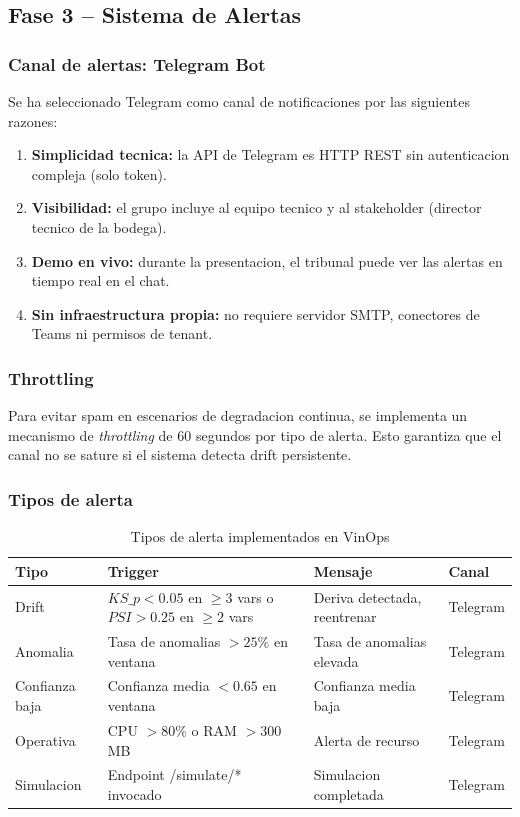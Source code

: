 \subsection{Fase 3 -- Sistema de Alertas}

\subsubsection{Canal de alertas: Telegram Bot}

Se ha seleccionado Telegram como canal de notificaciones por las siguientes razones:

\begin{enumerate}
    \item \textbf{Simplicidad tecnica:} la API de Telegram es HTTP REST sin autenticacion compleja (solo token).
    \item \textbf{Visibilidad:} el grupo incluye al equipo tecnico y al stakeholder (director tecnico de la bodega).
    \item \textbf{Demo en vivo:} durante la presentacion, el tribunal puede ver las alertas en tiempo real en el chat.
    \item \textbf{Sin infraestructura propia:} no requiere servidor SMTP, conectores de Teams ni permisos de tenant.
\end{enumerate}

\subsubsection{Throttling}

Para evitar spam en escenarios de degradacion continua, se implementa un mecanismo de \textit{throttling} de 60 segundos por tipo de alerta. Esto garantiza que el canal no se sature si el sistema detecta drift persistente.

\subsubsection{Tipos de alerta}

\begin{table}[htbp]
\centering
\caption{Tipos de alerta implementados en VinOps}
\label{tab:alertas}
\begin{tabular}{@{}llp{5cm}l@{}}
\toprule
\textbf{Tipo} & \textbf{Trigger} & \textbf{Mensaje} & \textbf{Canal} \\
\midrule
Drift & $KS\_p < 0.05$ en $\geq 3$ vars o $PSI > 0.25$ en $\geq 2$ vars & Deriva detectada, reentrenar & Telegram \\
Anomalia & Tasa de anomalias $> 25\%$ en ventana & Tasa de anomalias elevada & Telegram \\
Confianza baja & Confianza media $< 0.65$ en ventana & Confianza media baja & Telegram \\
Operativa & CPU $> 80\%$ o RAM $> 300$ MB & Alerta de recurso & Telegram \\
Simulacion & Endpoint /simulate/* invocado & Simulacion completada & Telegram \\
\bottomrule
\end{tabular}
\end{table}


